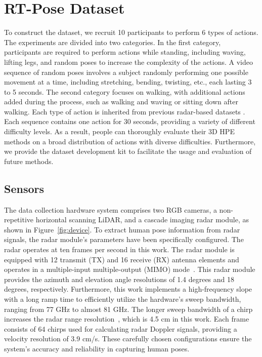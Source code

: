 \section{RT-Pose Dataset} 
To construct the dataset, we recruit 10 participants to perform 6 types of actions. The experiments are divided into two categories. In the first category, participants are required to perform actions while standing, including waving, lifting legs, and random poses to increase the complexity of the actions. A video sequence of random poses involves a subject randomly performing one possible movement at a time, including stretching, bending, twisting, etc., each lasting 3 to 5 seconds. The second category focuses on walking, with additional actions added during the process, such as walking and waving or sitting down after walking. Each type of action is inherited from previous radar-based datasets \cite{xue2021mmmesh,sengupta2022mmpose,an2021mars}. Each sequence contains one action for 30 seconds, providing a variety of different difficulty levels. 
As a result, people can thoroughly evaluate their 3D HPE methods on a broad distribution of actions with diverse difficulties. 
Furthermore, we provide the dataset development kit to facilitate the usage and evaluation of future methods.


\subsection{Sensors}
The data collection hardware system comprises two RGB cameras, a non-repetitive horizontal scanning LiDAR, and a cascade imaging radar module, as shown in Figure~\ref{fig:device}. 
To extract human pose information from radar signals, the radar module's parameters have been specifically configured.
The radar operates at ten frames per second in this work. The radar module is equipped with 12 transmit (TX) and 16 receive (RX) antenna elements and operates in a multiple-input multiple-output (MIMO) mode~\cite{kim2021human}. 
This radar module provides the azimuth and elevation angle resolutions of 1.4 degrees and 18 degrees, respectively. Furthermore, this work implements a high-frequency slope with a long ramp time to efficiently utilize the hardware's sweep bandwidth, ranging from 77 GHz to almost 81 GHz. The longer sweep bandwidth of a chirp increases the radar range resolution~\cite{klauder1960theory,sengupta2020mm}, which is 4.5 cm in this work. Each frame consists of 64 chirps used for calculating radar Doppler signals, providing a velocity resolution of 3.9 cm/s. These carefully chosen configurations ensure the system's accuracy and reliability in capturing human poses.



